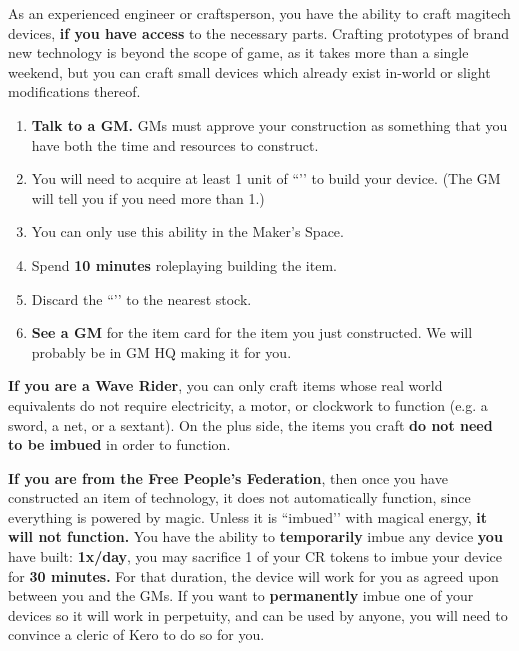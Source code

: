 \documentclass[green]{GL2020}
\begin{document}
\name{\gMagitechCrafting{}}

As an experienced engineer or craftsperson, you have the ability to craft magitech devices, \textbf{if you have access} to the necessary parts. Crafting prototypes of brand new technology is beyond the scope of game, as it takes more than a single weekend, but you can craft small devices which already exist in-world or slight modifications thereof. 

\begin{enumerate}
  \item \textbf{Talk to a GM.} GMs must approve your construction as something that you have both the time and resources to construct.
  \item You will need to acquire at least 1 unit of ``\iMagitechParts{}’’ to build your device. (The GM will tell you if you need more than 1.) 
  \item You can only use this ability in the Maker’s Space. 
  \item Spend \textbf{10 minutes} roleplaying building the item. 
  \item Discard the ``\iMagitechParts{}’’ to the nearest stock. 
  \item \textbf{See a GM} for the item card for the item you just constructed. We will probably be in GM HQ making it for you.
\end{enumerate}

\textbf{If you are a Wave Rider}, you can only craft items whose real world equivalents do not require electricity, a motor, or clockwork to function (e.g. a sword, a net, or a sextant). On the plus side, the items you craft \textbf{do not need to be imbued} in order to function. 

\textbf{If you are from the Free People's Federation}, then once you have constructed an item of technology, it does not automatically function, since everything is powered by magic. Unless it is ``imbued’’ with magical energy, \textbf{it will not function.} You have the ability to \textbf{temporarily} imbue any device \textbf{you} have built: \textbf{1x/day}, you may sacrifice 1 of your CR tokens to imbue your device for \textbf{30 minutes.} For that duration, the device will work for you as agreed upon between you and the GMs. If you want to \textbf{permanently} imbue one of your devices so it will work in perpetuity, and can be used by anyone, you will need to convince a cleric of Kero to do so for you.
\end{document}
